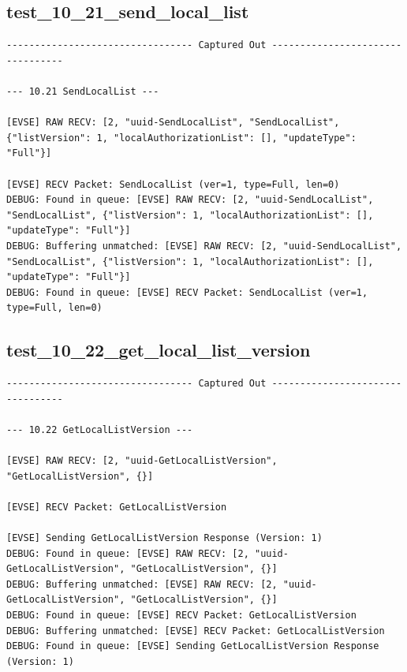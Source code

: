 \documentclass{article}
\begin{document}
\subsection*{test\_10\_21\_send\_local\_list}
\begin{lstlisting}
--------------------------------- Captured Out ---------------------------------

--- 10.21 SendLocalList ---

[EVSE] RAW RECV: [2, "uuid-SendLocalList", "SendLocalList", {"listVersion": 1, "localAuthorizationList": [], "updateType": "Full"}]

[EVSE] RECV Packet: SendLocalList (ver=1, type=Full, len=0)
DEBUG: Found in queue: [EVSE] RAW RECV: [2, "uuid-SendLocalList", "SendLocalList", {"listVersion": 1, "localAuthorizationList": [], "updateType": "Full"}]
DEBUG: Buffering unmatched: [EVSE] RAW RECV: [2, "uuid-SendLocalList", "SendLocalList", {"listVersion": 1, "localAuthorizationList": [], "updateType": "Full"}]
DEBUG: Found in queue: [EVSE] RECV Packet: SendLocalList (ver=1, type=Full, len=0)
\end{lstlisting}
\subsection*{test\_10\_22\_get\_local\_list\_version}
\begin{lstlisting}
--------------------------------- Captured Out ---------------------------------

--- 10.22 GetLocalListVersion ---

[EVSE] RAW RECV: [2, "uuid-GetLocalListVersion", "GetLocalListVersion", {}]

[EVSE] RECV Packet: GetLocalListVersion

[EVSE] Sending GetLocalListVersion Response (Version: 1)
DEBUG: Found in queue: [EVSE] RAW RECV: [2, "uuid-GetLocalListVersion", "GetLocalListVersion", {}]
DEBUG: Buffering unmatched: [EVSE] RAW RECV: [2, "uuid-GetLocalListVersion", "GetLocalListVersion", {}]
DEBUG: Found in queue: [EVSE] RECV Packet: GetLocalListVersion
DEBUG: Buffering unmatched: [EVSE] RECV Packet: GetLocalListVersion
DEBUG: Found in queue: [EVSE] Sending GetLocalListVersion Response (Version: 1)
\end{lstlisting}
\end{document}
